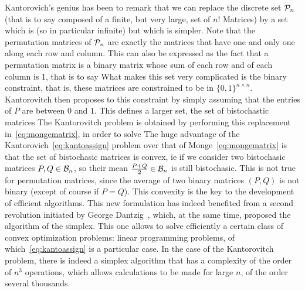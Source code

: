 Kantorovich's genius has been to remark that we can replace the discrete set $\mathcal{P}_n$ (that is to say composed of a finite, but very large, set of $n!$ Matrices) by a set which is   (so in particular infinite) but which is simpler. Note that the permutation matrices of $\mathcal{P}_n$ are exactly the matrices that have one and only one along each row and column. This can also be expressed as the fact that a permutation matrix is a binary matrix whose sum of each row and of each column is 1, that is to say
What makes this set very complicated is the binary constraint, that is, these matrices are constrained to be in $\{0,1\}^{n \times n}$. Kantorovitch then proposes to  this constraint by simply assuming that the entries of $P$ are between $0$ and $1$. This defines a larger set, the set of bistochastic matrices
The Kantorovitch problem is obtained by performing this replacement in~\eqref{eq:mongematrix}, in order to solve
The huge advantage of the Kantorovich~\eqref{eq:kantoassign} problem over that of Monge~\eqref{eq:mongematrix} is that the set of bistochasic matrices is convex, ie if we consider two bistochasic matrices $P, Q \in \mathcal{B}_n$, so their mean $\frac{P + Q}{2} \in \mathcal{B}_n$ is still bistochasic. This is not true for permutation matrices, since the average of two binary matrices $(P,Q)$ is not binary (except of course if $P=Q$). This convexity is the key to the development of efficient algorithms.
%
This new formulation has indeed benefited from a second revolution initiated by George Dantzig~\cite{Dantzig51}, which, at the same time, proposed the algorithm of the simplex. This one allows to solve efficiently a certain class of convex optimization problems: linear programming problems, of which~\eqref{eq:kantoassign} is a particular case. In the case of the Kantorovitch problem, there is indeed a simplex algorithm that has a complexity of the order of $n^3$ operations, which allows calculations to be made for large $n$, of the order several thousands.



